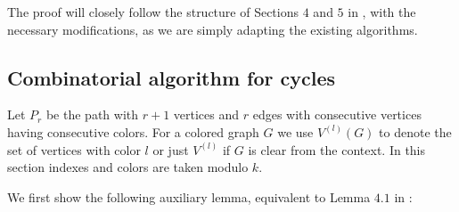 \documentclass[a4paper,UKenglish,cleveref, autoref, numberwithinsect, thm-restate]{lipics-v2021}
\begin{document}
	The proof will closely follow the structure of Sections $4$ and $5$ in \cite{GiLeSh+23}, with the necessary modifications, as we are simply adapting the existing algorithms.
	
	\subsection{Combinatorial algorithm for cycles}
	
	Let $P_r$ be the path with $r+1$ vertices and $r$ edges with consecutive vertices having consecutive colors. For a colored graph $G$ we use $V^{(l)}(G)$ to denote the set of vertices with color $l$ or just $V^{(l)}$ if $G$ is clear from the context. In this section indexes and colors are taken modulo $k$.
	
	We first show the following auxiliary lemma, equivalent to Lemma $4.1$ in \cite{GiLeSh+23}:
	
\end{document}
